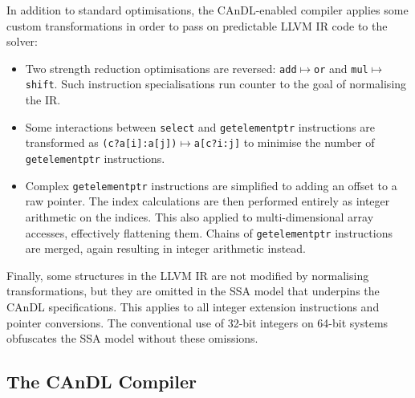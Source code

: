     In addition to standard optimisations, the CAnDL-enabled compiler applies
    some custom transformations in order to pass on predictable LLVM IR code
    to the solver:
    \begin{itemize}
        \item Two strength reduction optimisations are reversed:
              {\tt add}$\mapsto${\tt or} and {\tt mul}$\mapsto${\tt shift}.
              Such instruction specialisations run counter to the goal of
              normalising the IR.
        \item Some interactions between {\tt select} and {\tt getelementptr}
              instructions are transformed as
              {\tt (c?a[i]:a[j])}$\mapsto${\tt a[c?i:j]} to minimise the number
              of {\tt getelementptr} instructions.
        \item Complex {\tt getelementptr} instructions are simplified to adding
              an offset to a raw pointer.
              The index calculations are then performed entirely as integer
              arithmetic on the indices.
              This also applied to multi-dimensional array accesses, effectively
              flattening them.
              Chains of {\tt getelementptr} instructions are merged, again
              resulting in integer arithmetic instead.
    \end{itemize}
    Finally, some structures in the LLVM IR are not modified by normalising
    transformations, but they are omitted in the SSA model that underpins the
    CAnDL specifications.
    This applies to all integer extension instructions and pointer conversions.
    The conventional use of 32-bit integers on 64-bit systems obfuscates the
    SSA model without these omissions.

\pagebreak
\subsection{The CAnDL Compiler}

